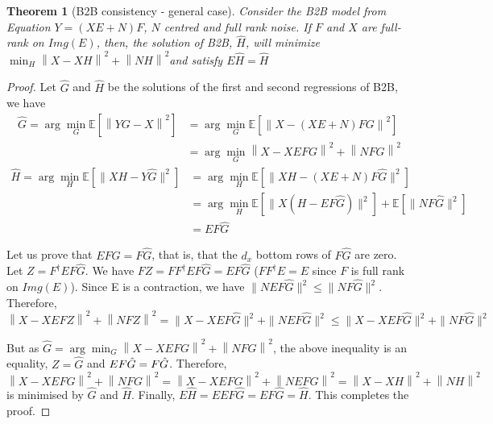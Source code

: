 \documentclass{article}
\newtheorem{theorem}{Theorem}
\begin{document}
\begin{theorem}[B2B consistency - general case]

     Consider the B2B model from Equation $Y = (XE + N)F$, $N$ centred and full rank noise.
     If $F$ and $X$ are full-rank on $Img(E)$, then, the solution of B2B, $\hat H$, will minimize
     $\min_H  \left \| X - XH\right\| ^2  + \left \| NH\right \| ^2$and satisfy $E\hat H = \hat H$
\end{theorem}
\begin{proof}

 Let $\hat G$ and $\hat H$ be the solutions of the first and second regressions of B2B, we have
 \begin{align*}
    \hat G = \arg \min_G \mathbb{E}[\left \| YG - X \right \|^2] &=   \arg \min_G \mathbb{E}[\left \| X - (XE + N)FG \right\|^2]\\
                                                        &{}= \arg \min_G \left \| X - XEFG\right\| ^2  + \left \| NFG\right \| ^2
     \label{eq:doublenorm}
\end{align*}
\begin{align*}
    \hat H = \arg \min_H \mathbb{E}[\| XH - Y \hat{G} \|^2] &=\arg  \min_H \mathbb{E}[\| XH - (XE + N)F \hat G \|^2] \\
    &=\arg \min_H \mathbb{E}[\| X(H - EF \hat G) \| ^2] + \mathbb{E}[\| NF\hat G \| ^2]\\
    &= EF \hat G
\end{align*}

Let us prove that $EF\hat G = F\hat G$, that is, that the $d_x$ bottom rows of $F\hat G$ are zero. Let $Z=F^\dagger EF\hat G$. We have $FZ = FF^\dagger EF  \hat G= EF\hat G$ ($FF^\dagger E =E$ since $F$ is full rank on $Img(E)$). Since E is a contraction, we have $ \| NEF\hat G\|^2 \leq \| NF\hat G \|^2$. Therefore,
 $$\left \| X - XEFZ\right \| ^2  + \left \| NFZ\right \| ^2 = \| X - XEF\hat G \| ^2  + \| NEF\hat G \| ^2 \leq \| X - XEF\hat G \| ^2  + \| NF\hat G \| ^2$$

But as $\hat G =  \arg \min_G \left \| X - XEFG\right\| ^2  + \left \| NFG\right \| ^2$, the above inequality is an equality, $Z=\hat G$ and $EF\hat G = F\Hat G$. Therefore, $\left \| X - XEFG\right \| ^2  + \left \| NFG\right \| ^2 = \left \| X - XEFG\right \| ^2  + \left \| NEFG\right \| ^2 = \left \| X - XH\right \| ^2  + \left \| NH\right \| ^2$ is minimised by $\hat G$ and $\hat H$. Finally, $E\hat H = E EF\hat G = EF\hat G = \hat H$. This completes the proof.
\end{proof}
\end{document}

